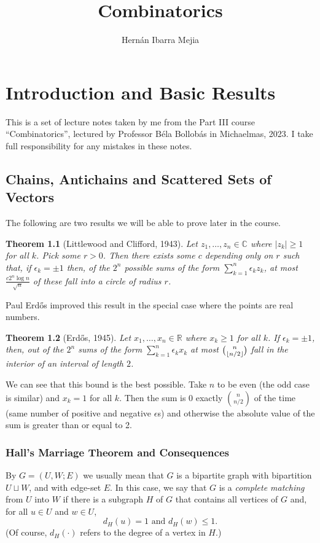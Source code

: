 \documentclass{report}
\DeclarePairedDelimiter\floor{\lfloor}{\rfloor}
\theoremstyle{definition}
\theoremstyle{plain}
\newtheorem{thm}{Theorem}[section]
\theoremstyle{definition}
\begin{document}
	\title{Combinatorics}
	\author{Hernán Ibarra Mejia}
	\maketitle
	\chapter{Introduction and Basic Results}
	This is a set of lecture notes taken by me from the Part III course ``Combinatorics'', lectured by Professor Béla Bollobás in Michaelmas, 2023. I take full responsibility for any mistakes in these notes.
	\section{Chains, Antichains and Scattered Sets of Vectors}
	The following are two results we will be able to prove later in the course.
	\begin{thm}[Littlewood and Clifford, 1943]
		Let $z_1,\ldots, z_n\in \mathbb{C}$	where $|z_k|\geq 1$ for all $k$. Pick some $r>0$. Then there exists some $c$ depending only on $r$ such that, if $\epsilon_k = \pm 1$ then, of the $2^n$ possible sums of the form $\sum_{k=1}^{n}\epsilon_k z_k$, at most $\frac{c2^n\log n}{\sqrt{n}}$ of these fall into a circle of radius $r$.
	\end{thm}
	Paul Erd\H{o}s improved this result in the special case where the points are real numbers.
	\begin{thm}[Erd\H{o}s, 1945]\label{thm:erdos_L_O}
		Let $x_1,\ldots,x_n\in \mathbb{R}$ where $x_k\geq 1$ for all $k$. If $\epsilon_k = \pm 1$, then, out of the $2^n$ sums of the form $\sum_{k=1}^{n}\epsilon_k x_k$ at most $\binom{n}{\floor{n/2}}$ fall in the interior of an interval of length $2$.
	\end{thm}
	We can see that this bound is the best possible. Take $n$ to be even (the odd case is similar) and $x_k = 1$ for all $k$. Then the sum is 0 exactly $\binom{n}{n/2}$ of the time (same number of positive and negative $\epsilon$s) and otherwise the absolute value of the sum is greater than or equal to 2.
	\subsection{Hall's Marriage Theorem and  Consequences}
	By $G = (U,W;E)$ we usually mean that $G$ is a bipartite graph with bipartition $U\sqcup W$, and with edge-set $E$. In this case, we say that $G$ is a \emph{complete matching} from $U$ into $W$ if there is a subgraph $H$ of $G$ that contains all vertices of $G$ and, for all $u\in U$ and $w\in U$,
	\[
		d_H(u) = 1 \text{ and }d_H(w) \leq 1.
	\]
	(Of course, $d_H(\cdot)$ refers to the degree of a vertex in $H$.)
	
\end{document}
